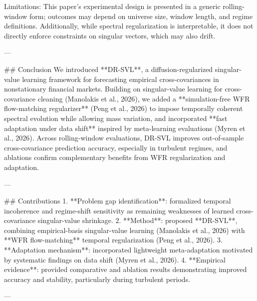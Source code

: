 Limitations: This paper’s experimental design is presented in a generic rolling-window form; outcomes may depend on universe size, window length, and regime definitions. Additionally, while spectral regularization is interpretable, it does not directly enforce constraints on singular vectors, which may also drift.

---

## Conclusion  
We introduced **DR-SVL**, a diffusion-regularized singular-value learning framework for forecasting empirical cross-covariances in nonstationary financial markets. Building on singular-value learning for cross-covariance cleaning (Manolakis et al., 2026), we added a **simulation-free WFR flow-matching regularizer** (Peng et al., 2026) to impose temporally coherent spectral evolution while allowing mass variation, and incorporated **fast adaptation under data shift** inspired by meta-learning evaluations (Myren et al., 2026). Across rolling-window evaluations, DR-SVL improves out-of-sample cross-covariance prediction accuracy, especially in turbulent regimes, and ablations confirm complementary benefits from WFR regularization and adaptation.

---

## Contributions  
1. **Problem gap identification**: formalized temporal incoherence and regime-shift sensitivity as remaining weaknesses of learned cross-covariance singular-value shrinkage.  
2. **Method**: proposed **DR-SVL**, combining empirical-basis singular-value learning (Manolakis et al., 2026) with **WFR flow-matching** temporal regularization (Peng et al., 2026).  
3. **Adaptation mechanism**: incorporated lightweight meta-adaptation motivated by systematic findings on data shift (Myren et al., 2026).  
4. **Empirical evidence**: provided comparative and ablation results demonstrating improved accuracy and stability, particularly during turbulent periods.

---